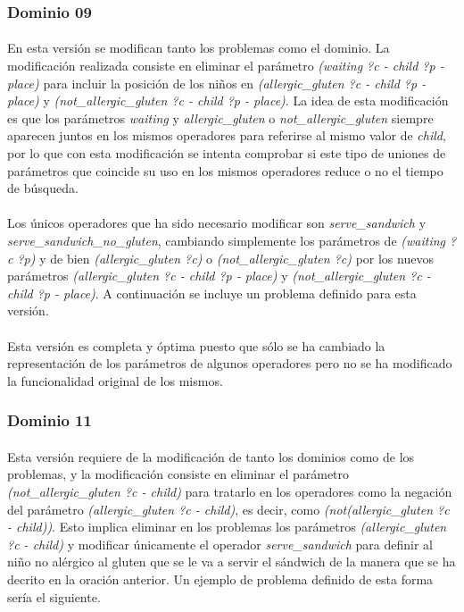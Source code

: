 \documentclass{article}
\begin{document}
\subsubsection{Dominio 09}

\paragraph{}
En esta versión se modifican tanto los problemas como el dominio. La modificación realizada consiste en eliminar el parámetro \textit{(waiting ?c - child ?p - place)} para incluir la posición de los niños en \textit{(allergic\_gluten ?c - child ?p - place)} y \textit{(not\_allergic\_gluten ?c - child ?p - place)}. La idea de esta modificación es que los parámetros \textit{waiting} y \textit{allergic\_gluten} o \textit{not\_allergic\_gluten} siempre aparecen juntos en los mismos operadores para referirse al mismo valor de \textit{child}, por lo que con esta modificación se intenta comprobar si este tipo de uniones de parámetros que coincide su uso en los mismos operadores reduce o no el tiempo de búsqueda.

\paragraph{}
Los únicos operadores que ha sido necesario modificar son \textit{serve\_sandwich} y \textit{serve\_sandwich\_no\_gluten}, cambiando simplemente los parámetros de \textit{(waiting ?c ?p)} y de bien \textit{(allergic\_gluten ?c)} o \textit{(not\_allergic\_gluten ?c)} por los nuevos parámetros \textit{(allergic\_gluten ?c - child ?p - place)} y \textit{(not\_allergic\_gluten ?c - child ?p - place)}. A continuación se incluye un problema definido para esta versión.

\paragraph{}
Esta versión es completa y óptima puesto que sólo se ha cambiado la representación de los parámetros de algunos operadores pero no se ha modificado la funcionalidad original de los mismos.

\subsubsection{Dominio 11}

\paragraph{}
Esta versión requiere de la modificación de tanto los dominios como de los problemas, y la modificación consiste en eliminar el parámetro \textit{(not\_allergic\_gluten ?c - child)} para tratarlo en los operadores como la negación del parámetro \textit{(allergic\_gluten ?c - child)}, es decir, como \textit{(not(allergic\_gluten ?c - child))}. Esto implica eliminar en los problemas los parámetros \textit{(allergic\_gluten ?c - child)} y modificar únicamente el operador \textit{serve\_sandwich} para definir al niño no alérgico al gluten que se le va a servir el sándwich de la manera que se ha decrito en la oración anterior. Un ejemplo de problema definido de esta forma sería el siguiente.
\end{document}
